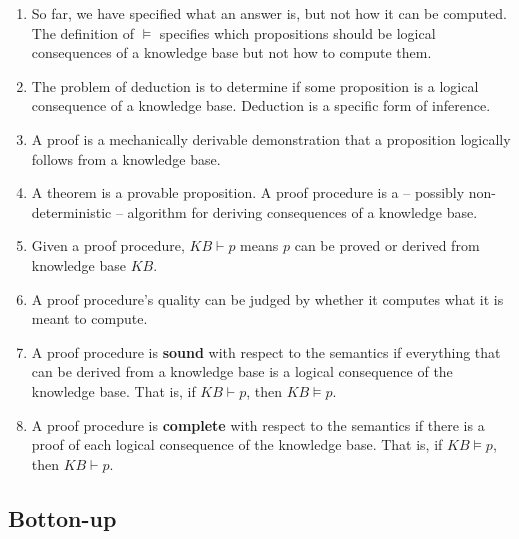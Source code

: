 \documentclass[12pt,a4paper, brazil]{article}
\begin{document}
\begin{enumerate}
  \item So far, we have specified what an answer is, but not how it can be computed. The definition of \(\models\) specifies which propositions should be logical consequences of a knowledge base but not how to compute them. 
  
  \item The problem of deduction is to determine if some proposition is a logical consequence of a knowledge base. Deduction is a specific form of inference.

  \item A proof is a mechanically derivable demonstration that a proposition logically follows from a knowledge base. 
  
  \item A theorem is a provable proposition. A proof procedure is a -- possibly non-deterministic -- algorithm for deriving consequences of a knowledge base. 
  
  \item Given a proof procedure, \( KB \vdash p \) means \( p \) can be proved or derived from knowledge base \( KB \).
  
  \item A proof procedure's quality can be judged by whether it computes what it is meant to compute.
  
  \item A proof procedure is \textbf{sound} with respect to the semantics if everything that can be derived from a knowledge base is a logical consequence of the knowledge base. That is, if \( KB \vdash p \), then \( KB \models p \).
  
  \item A proof procedure is \textbf{complete} with respect to the semantics if there is a proof of each logical consequence of the knowledge base. That is, if \( KB \models p \), then \( KB \vdash p \).
  
\end{enumerate}

\pagebreak

\subsection{Botton-up}
\end{document}
